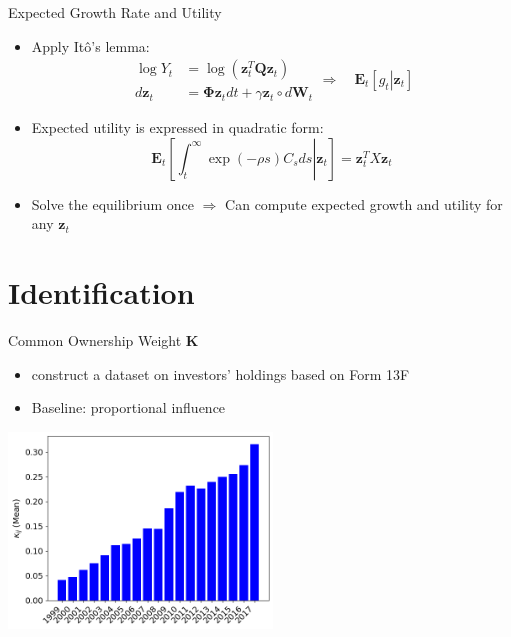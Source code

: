 \documentclass[
  10pt,
  aspectratio=169,   %
  handout           %
]{beamer}
\theoremstyle{plain}
\begin{document}
\begin{frame}{Expected Growth Rate and Utility}
  \label{aggregation}
  \begin{itemize}
    \item Apply Itô's lemma:\hfill \hyperlink{Y_process}{}
    \[
    \begin{array}{cl}
      \log Y_{t} & =\log\left(\bm{z}_{t}^{T}\bm{Q}\bm{z}_{t}\right)\\
      d\bm{z}_{t} & =\bm{\Phi}\bm{z}_{t}dt+\gamma\bm{z}_{t} \circ d\bm{W}_{t}
    \end{array}
    \Longrightarrow \quad \bm{E}_{t}\left[\left.g_{t}\right|\bm{z}_{t}\right]
    \]
    \item Expected utility is expressed in quadratic form: \hfill \hyperlink{X}{}
    \[
      \bm{E}_{t}\left[\left.\int_{t}^{\infty}\exp\left(-\rho s\right)C_{s}ds\right|\bm{z}_{t}\right]=\bm{z}_{t}^{T}X\bm{z}_{t}
    \]
    \item Solve the equilibrium once $\Longrightarrow$ Can compute expected growth and utility for any $\bm{z}_{t}$
  \end{itemize}
\end{frame}

\section{Identification}

\begin{frame}{Common Ownership Weight $\bm{K}$}
  \begin{itemize}
    \item \citet{Backus2021-yt} construct a dataset on investors' holdings based on Form 13F
    \item Baseline: \citet{Rotemberg1984-jz} proportional influence \hfill\hyperlink{rotemberg}{}
  \end{itemize}
  \begin{center}
    \includegraphics[width=7cm]{figures/kappa}
  \end{center}
\end{frame}
\end{document}
